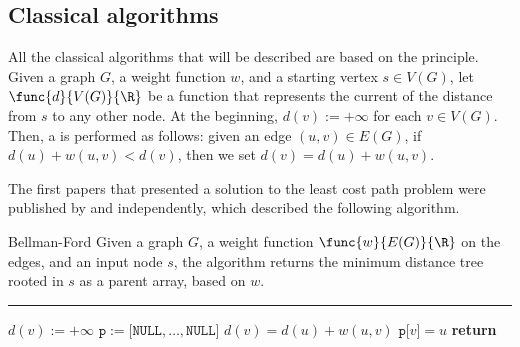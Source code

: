 \documentclass[a4paper, 12pt]{report}
\begin{document}
    \subsection{Classical algorithms}
    
    All the classical algorithms that will be described are based on the  principle. Given a graph $G$, a weight function $w$, and a starting vertex $s \in V(G)$, let $\func{d}{V(G)}{\R}$ be a function that represents the current  of the distance from $s$ to any other node. At the beginning, $d(v) := + \infty$ for each $v \in V(G)$. Then, a  is performed as follows: given an edge $(u, v) \in E(G)$, if $d(u) + w(u, v) < d(v)$, then we set $d(v) = d(u) + w(u, v)$.

    The first papers that presented a solution to the least cost path problem were published by \textcite{bellman} and \textcite{ford} independently, which described the following algorithm.

    \begin{framedalgo}{Bellman-Ford}
        Given a graph $G$, a weight function $\func{w}{E(G)}{\R}$ on the edges, and an input node $s$, the algorithm returns the minimum distance tree rooted in $s$ as a parent array, based on $w$. \\
        \hrule

        \quad
        \label{alg:bellman_ford}
        \begin{algorithmic}[1]
                    \State $d(v) := +\infty$
                \EndFor
                \State $\texttt{p} := \texttt{[}\texttt{NULL}, \ldots, \texttt{NULL}\texttt{]}$
                         
                            \State $d(v) = d(u) + w(u, v)$
                            \State $\texttt{p[}v\texttt{]} = u$
                        \EndIf
                    \EndFor
                \EndFor
                \State \textbf{return} 
            \EndFunction
        \end{algorithmic}
    \end{framedalgo}

\end{document}
